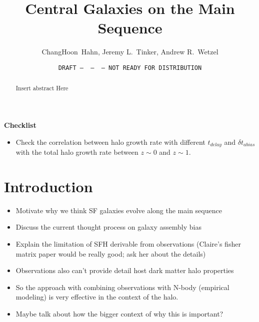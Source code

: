 \documentclass[12pt, letterpaper, preprint]{aastex}
\newcommand{\bitem}{\begin{itemize}}
\newcommand{\eitem}{\end{itemize}}
\begin{document}
\sloppy\sloppypar\frenchspacing

\title{Central Galaxies on the Main Sequence} 
\date{\texttt{DRAFT~---~\githash~---~\gitdate~---~NOT READY FOR DISTRIBUTION}}
\author{ChangHoon~Hahn, 
Jeremy L.~Tinker, 
Andrew R.~Wetzel}

\begin{abstract}
    Insert abstract Here 
\end{abstract}


{\bf Checklist} 
\bitem
\item Check the correlation between halo growth rate with different $t_{delay}$ and $\delta t_{abias}$ with the total halo growth rate between $z \sim 0$ and $z \sim 1$. 
\eitem 

\section{Introduction}
\bitem 
\item Motivate why we think SF galaxies evolve along the main sequence  
\item Discuss the current thought process on galaxy assembly bias 
\item Explain the limitation of SFH derivable from observations (Claire's fisher matrix paper would be really good; ask her about the details) 
\item Observations also can't provide detail host dark matter halo properties
\item So the approach with combining observations with N-body (empirical modeling) is very effective in the context of the halo.
\item Maybe talk about how the bigger context of why this is important?  
\eitem 
%
\end{document}
